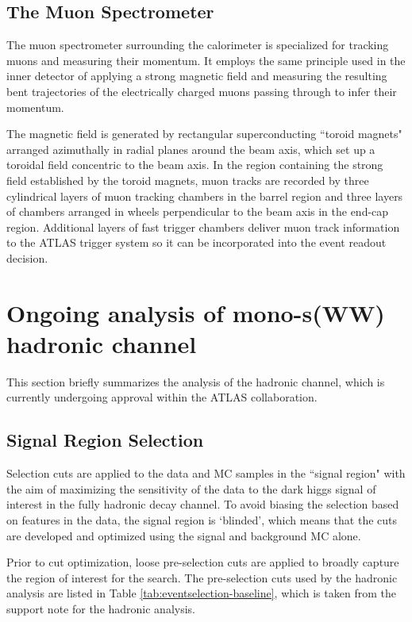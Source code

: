 \documentclass[12pt]{article}
\begin{document}
\subsection{The Muon Spectrometer}

The muon spectrometer \cite{atlas} surrounding the calorimeter is specialized for tracking muons and measuring their momentum. It employs the same principle used in the inner detector of applying a strong magnetic field and measuring the resulting bent trajectories of the electrically charged muons passing through to infer their momentum. 

The magnetic field is generated by rectangular superconducting ``toroid magnets" arranged azimuthally in radial planes around the beam axis, which set up a toroidal field concentric to the beam axis. In the region containing the strong field established by the toroid magnets, muon tracks are recorded by three cylindrical layers of muon tracking chambers in the barrel region and three layers of chambers arranged in wheels perpendicular to the beam axis in the end-cap region. Additional layers of fast trigger chambers deliver muon track information to the ATLAS trigger system so it can be incorporated into the event readout decision. 

\section{Ongoing analysis of mono-s(WW) hadronic channel}

This section briefly summarizes the analysis of the hadronic channel, which is currently undergoing  approval within the ATLAS collaboration. 

\subsection{Signal Region Selection}

Selection cuts are applied to the data and MC samples in the ``signal region" with the aim of maximizing the sensitivity of the data to the dark higgs signal of interest in the fully hadronic decay channel. To avoid biasing the selection based on features in the data, the signal region is `blinded', which means that the cuts are developed and optimized using the signal and background MC alone.

Prior to cut optimization, loose pre-selection cuts are applied to broadly capture the region of interest for the search. The pre-selection cuts used by the hadronic analysis are listed in Table \ref{tab:eventselection-baseline}, which is taken from the support note for the hadronic analysis.
\end{document}
